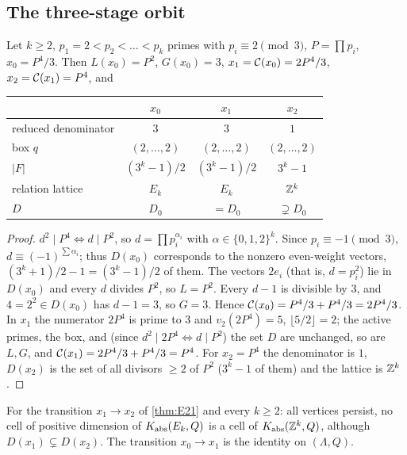\subsection{The three-stage orbit}\label{sec:threestage}
\begin{theorem}\label{thm:E21}
Let $k\ge2$, $p_1=2<p_2<\dots<p_k$ primes with $p_i\equiv2\pmod 3$, $P=\prod p_i$, $x_0=P^4/3$. Then $L(x_0)=P^2$, $G(x_0)=3$, $x_1=\mathcal C(x_0)=2P^4/3$, $x_2=\mathcal C(x_1)=P^4$, and
\begin{center}\small
\begin{tabular}{@{}lccc@{}}\toprule
 & $x_0$ & $x_1$ & $x_2$\\\midrule
reduced denominator & $3$ & $3$ & $1$\\
box $q$ & $(2,\dots,2)$ & $(2,\dots,2)$ & $(2,\dots,2)$\\
$|F|$ & $(3^k-1)/2$ & $(3^k-1)/2$ & $3^k-1$\\
relation lattice & $E_k$ & $E_k$ & $\mathbb Z^k$\\
$D$ & $D_0$ & $=D_0$ & $\supsetneq D_0$\\\bottomrule
\end{tabular}
\end{center}
\end{theorem}
\begin{proof}
$d^2\mid P^4\iff d\mid P^2$, so $d=\prod p_i^{\alpha_i}$ with $\alpha\in\{0,1,2\}^k$. Since $p_i\equiv-1\pmod3$, $d\equiv(-1)^{\sum\alpha_i}$; thus $D(x_0)$ corresponds to the nonzero even-weight vectors, $(3^k+1)/2-1=(3^k-1)/2$ of them. The vectors $2e_i$ (that is, $d=p_i^2$) lie in $D(x_0)$ and every $d$ divides $P^2$, so $L=P^2$. Every $d-1$ is divisible by $3$, and $4=2^2\in D(x_0)$ has $d-1=3$, so $G=3$. Hence $\mathcal C(x_0)=P^4/3+P^4/3=2P^4/3$. In $x_1$ the numerator $2P^4$ is prime to $3$ and $v_2(2P^4)=5$, $\lfloor5/2\rfloor=2$; the active primes, the box, and (since $d^2\mid2P^4\iff d\mid P^2$) the set $D$ are unchanged, so are $L,G$, and $\mathcal C(x_1)=2P^4/3+P^4/3=P^4$. For $x_2=P^4$ the denominator is $1$, $D(x_2)$ is the set of all divisors $\ge2$ of $P^2$ ($3^k-1$ of them) and the lattice is $\mathbb Z^k$. \qedhere
\end{proof}
\begin{corollary}\label{cor:threestage}
For the transition $x_1\to x_2$ of \cref{thm:E21} and every $k\ge2$: all vertices persist, no cell of positive dimension of $K_{\mathrm{abs}}(E_k,Q)$ is a cell of $K_{\mathrm{abs}}(\mathbb Z^k,Q)$, although $D(x_1)\subsetneq D(x_2)$. The transition $x_0\to x_1$ is the identity on $(\Lambda,Q)$.
\end{corollary}
